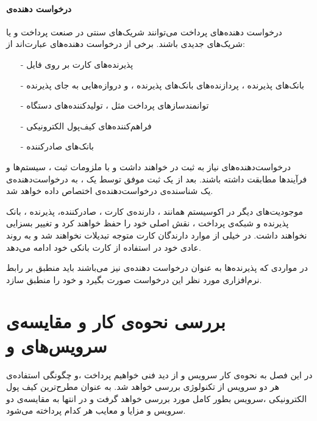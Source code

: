 \documentclass[oneside]{report}
\begin{document}
\subsubsection{درخواست دهنده‌ی{\normalsize {}}}
درخواست دهنده‌های 
{\normalsize {}}
پرداخت می‌توانند شریک‌های سنتی در صنعت پرداخت و یا شریک‌های جدیدی باشند. برخی از درخواست دهنده‌های 
{\normalsize {}}
عبارت‌اند از: 
\begin{itemize}
	\item[-] پذیرنده‌های کارت بر روی فایل
	\item[-]بانک‌های پذیرنده ، پردازنده‌های بانک‌های پذیرنده ، و دروازه‌هایی به جای پذیرنده
	\item[-]توانمندسازهای پرداخت مثل ، 
	تولیدکننده‌های دستگاه
	{\normalsize {}}
	\item[-]فراهم‌کننده‌های کیف‌پول الکترونیکی
	\item[-] بانک‌های صادرکننده 
\end{itemize}
درخواست‌دهنده‌های 
{\normalsize {}}
نیاز به ثبت در 
{\normalsize {}}
خواهند داشت و با ملزومات ثبت ، سیستم‌ها و فرآیندها مطابقت داشته باشند. بعد از یک ثبت موفق توسط یک 
{\normalsize {}}
، به درخواست‌دهنده‌ی 
{\normalsize {}}
یک شناسنده‌ی درخواست‌دهنده‌ی 
{\normalsize {}}
اختصاص داده خواهد شد. 

موجودیت‌‌های دیگر در اکوسیستم 
			{\normalsize {}}
همانند ، دارنده‌ی کارت ، صادرکننده، پذیرنده ، بانک پذیرنده و شبکه‌ی پرداخت ، نقش اصلی خود را حفظ خواهند کرد و تغییر بسزایی نخواهند داشت. در خیلی از موارد دارندگان کارت متوجه تبدیلات  
{\normalsize {}}
نخواهند شد و به روند عادی خود در استفاده از کارت بانکی خود ادامه می‌دهد.

در مواردی که پذیرنده‌ها به عنوان درخواست دهنده‌ی 
{\normalsize {}}
نیز می‌باشند باید منطبق بر رابط نرم‌افزاری
{\normalsize {}}
مورد نظر این درخواست صورت بگیرد و خود را منطبق سازد. 
\cite{emvframework}


											
					
					
		\chapter{بررسی نحوه‌ی کار و مقایسه‌ی  سرویس‌های   {\Large{} }  و   {\Large{} }}\label{comparison}
		در این فصل به نحوه‌ی کار سرویس 
							{\normalsize {}} 
		و 
							{\normalsize {}}
	از دید فنی خواهیم پرداخت ،و چگونگی استفاده‌ی هر دو سرویس از تکنولوژی 
						{\normalsize {}} 
	بررسی خواهد شد. به عنوان مطرح‌ترین کیف پول الکترونیکی ،سرویس 
						{\normalsize {}}
 بطور کامل مورد بررسی خواهد گرفت و در انتها به مقایسه‌ی دو سرویس و مزایا و معایب هر کدام پرداخته می‌شود.
 
\end{document}
